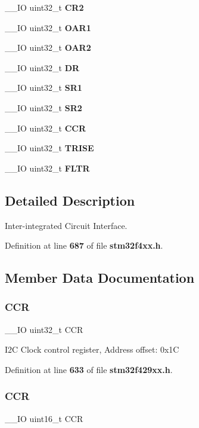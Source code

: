 \begin{DoxyCompactItemize}
\item 
\+\_\+\+\_\+\+IO uint32\+\_\+t \textbf{ C\+R2}
\item 
\+\_\+\+\_\+\+IO uint32\+\_\+t \textbf{ O\+A\+R1}
\item 
\+\_\+\+\_\+\+IO uint32\+\_\+t \textbf{ O\+A\+R2}
\item 
\+\_\+\+\_\+\+IO uint32\+\_\+t \textbf{ DR}
\item 
\+\_\+\+\_\+\+IO uint32\+\_\+t \textbf{ S\+R1}
\item 
\+\_\+\+\_\+\+IO uint32\+\_\+t \textbf{ S\+R2}
\item 
\+\_\+\+\_\+\+IO uint32\+\_\+t \textbf{ C\+CR}
\item 
\+\_\+\+\_\+\+IO uint32\+\_\+t \textbf{ T\+R\+I\+SE}
\item 
\+\_\+\+\_\+\+IO uint32\+\_\+t \textbf{ F\+L\+TR}
\end{DoxyCompactItemize}


\subsection{Detailed Description}
Inter-\/integrated Circuit Interface. 

Definition at line \textbf{ 687} of file \textbf{ stm32f4xx.\+h}.



\subsection{Member Data Documentation}
\mbox{\label{structI2C__TypeDef_a5e1322e27c40bf91d172f9673f205c97}} 
\subsubsection{C\+CR\hspace{0.1cm}{\footnotesize\ttfamily [1/2]}}
{\footnotesize\ttfamily \+\_\+\+\_\+\+IO uint32\+\_\+t C\+CR}

I2C Clock control register, Address offset\+: 0x1C 

Definition at line \textbf{ 633} of file \textbf{ stm32f429xx.\+h}.

\mbox{\label{structI2C__TypeDef_a7ac198788f460fa6379bceecab79c5f7}} 
\subsubsection{C\+CR\hspace{0.1cm}{\footnotesize\ttfamily [2/2]}}
{\footnotesize\ttfamily \+\_\+\+\_\+\+IO uint16\+\_\+t C\+CR}

